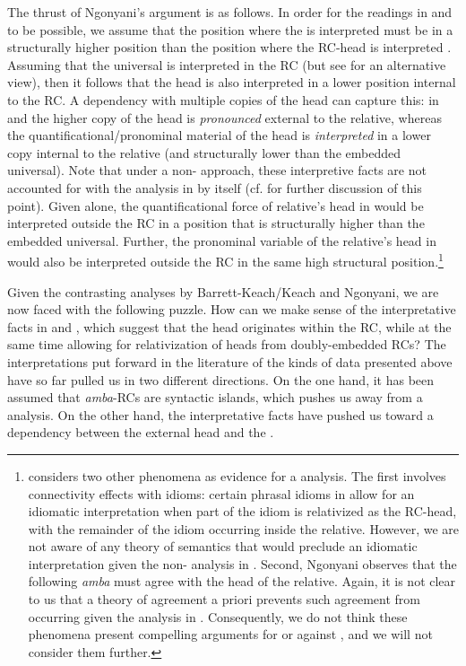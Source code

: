 \documentclass[output=paper,modfonts,nonflat,hidelinks]{langsci/langscibook}
\begin{document}
The thrust of Ngonyani’s argument is as follows. In order for the readings in  and  to be possible, we assume that the position where the  is interpreted must be in a structurally higher position than the position where the RC-head is interpreted \citep[cf.][]{Heim1998}. Assuming that the universal is interpreted in the RC (but see  for an alternative view), then it follows that the head is also interpreted in a lower position internal to the RC. A  dependency with multiple copies of the head can capture this: in  and  the higher copy of the head is \textit{pronounced} external to the relative, whereas the quantificational/pronominal material of the head is \textit{interpreted} in a lower copy internal to the relative (and structurally lower than the embedded universal). Note that under a non- approach, these interpretive facts are not accounted for with the analysis in  by itself (cf.  for further discussion of this point). Given  alone, the quantificational force of relative’s head in  would be interpreted outside the RC in a position that is structurally higher than the embedded universal. Further, the pronominal variable of the relative’s head in  would also be interpreted outside the RC in the same high structural position.{}\footnote{\citet{Ngonyani2001} considers two other phenomena as evidence for a  analysis. The first involves connectivity effects with idioms: certain phrasal idioms in  allow for an idiomatic interpretation when part of the idiom is relativized as the RC-head, with the remainder of the idiom occurring inside the relative. However, we are not aware of any theory of semantics that would preclude an idiomatic interpretation given the non- analysis in . Second, Ngonyani observes that the  following \textit{amba} must agree with the head of the relative. Again, it is not clear to us that a theory of agreement a priori prevents such agreement from occurring given the analysis in . Consequently, we do not think these phenomena present compelling arguments for or against , and we will not consider them further.}

Given the contrasting analyses by Barrett-Keach/Keach and Ngonyani, we are now faced with the following puzzle. How can we make sense of the interpretative facts in  and , which suggest that the head originates within the RC, while at the same time allowing for relativization of heads from doubly-embedded RCs? The interpretations put forward in the literature of the kinds of data presented above have so far pulled us in two different directions. On the one hand, it has been assumed that \textit{amba}{}-RCs are syntactic islands, which pushes us away from a  analysis. On the other hand, the interpretative facts have pushed us toward a  dependency between the external head and the .
\end{document}
